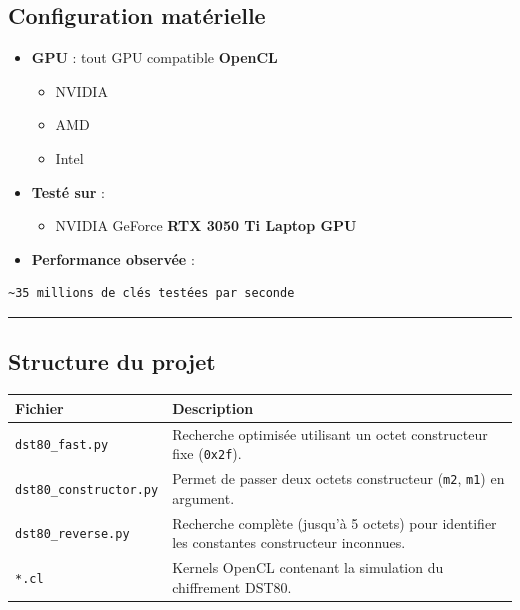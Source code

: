 \documentclass[
  french,
]{article}
\providecommand{\tightlist}{%
  \setlength{\itemsep}{0pt}\setlength{\parskip}{0pt}}
\begin{document}
\subsection{Configuration
matérielle}\label{configuration-matuxe9rielle-1}

\begin{itemize}
\item
  \textbf{GPU} : tout GPU compatible \textbf{OpenCL}

  \begin{itemize}
  \tightlist
  \item
    NVIDIA
  \item
    AMD
  \item
    Intel
  \end{itemize}
\item
  \textbf{Testé sur} :

  \begin{itemize}
  \tightlist
  \item
    NVIDIA GeForce \textbf{RTX 3050 Ti Laptop GPU}
  \end{itemize}
\item
  \textbf{Performance observée} :
\end{itemize}

\begin{verbatim}
~35 millions de clés testées par seconde
\end{verbatim}

\begin{center}\rule{0.5\linewidth}{0.5pt}\end{center}

\subsection{Structure du projet}\label{structure-du-projet}

\begin{longtable}[]{@{}
  >{\raggedright\arraybackslash}p{}
  >{\raggedright\arraybackslash}p{}@{}}
\toprule\noalign{}
\begin{minipage}[b]{\linewidth}\raggedright
Fichier
\end{minipage} & \begin{minipage}[b]{\linewidth}\raggedright
Description
\end{minipage} \\
\midrule\noalign{}
\endhead
\bottomrule\noalign{}
\endlastfoot
\texttt{dst80\_fast.py} & Recherche optimisée utilisant un octet
constructeur fixe (\texttt{0x2f}). \\
\texttt{dst80\_constructor.py} & Permet de passer deux octets
constructeur (\texttt{m2}, \texttt{m1}) en argument. \\
\texttt{dst80\_reverse.py} & Recherche complète (jusqu'à 5 octets) pour
identifier les constantes constructeur inconnues. \\
\texttt{*.cl} & Kernels OpenCL contenant la simulation du chiffrement
DST80. \\
\end{longtable}
\end{document}
